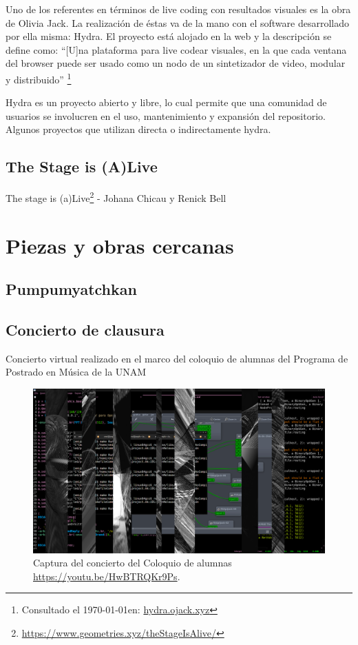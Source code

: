 Uno de los referentes en términos de live coding con resultados visuales es la obra de Olivia Jack. La realización de éstas va de la mano con el software desarrollado por ella misma: Hydra. El proyecto está alojado en la web y la descripción se define como: ``[U]na plataforma para live codear visuales, en la que cada ventana del browser puede ser usado como un nodo de un sintetizador de video, modular y distribuido'' \footnote{Consultado el \today en: \url{hydra.ojack.xyz}}

Hydra es un proyecto abierto y libre, lo cual permite que una comunidad de usuarios se involucren en el uso, mantenimiento y expansión del repositorio. Algunos proyectos que utilizan directa o indirectamente hydra. 

\subsection{The Stage is (A)Live}

The stage is (a)Live\footnote{\url{https://www.geometries.xyz/theStageIsAlive/}} - Johana Chicau y Renick Bell

\section{Piezas y obras cercanas} %

\subsection{Pumpumyatchkan}

\subsection{Concierto de clausura}

Concierto virtual realizado en el marco del coloquio de alumnas del Programa de Postrado en Música de la UNAM

\begin{figure}[tb]
\centering 
\includegraphics[width=\columnwidth]{img/col2.png} 
\caption[Concierto coloquio]{Captura del concierto del Coloquio de alumnas \url{https://youtu.be/HwBTRQKr9Ps}.} %
\label{fig:gallery} 
\end{figure}

